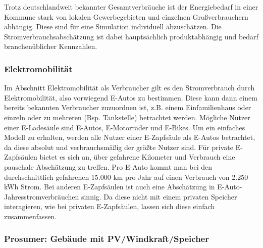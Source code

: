 Trotz deutschlandweit bekannter Gesamtverbräuche ist der Energiebedarf in einer Kommune stark von lokalen Gewerbegebieten und einzelnen Großverbrauchern abhängig. 
Diese sind für eine Simulation individuell abzuschätzen. Die Stromverbrauchsabschätzung ist dabei hauptsächlich produktabhängig und bedarf branchenüblicher Kennzahlen.

\subsubsection{Elektromobilität}

Im Abschnitt Elektromobilität als Verbraucher gilt es den Stromverbrauch durch Elektromobilität, also vorwiegend E-Autos zu bestimmen. 
Diese kann dann einem bereits bekannten Verbraucher zuzuordnen ist, z.B. einem Einfamilienhaus oder einzeln oder zu mehreren (Bsp. Tankstelle) betrachtet werden.
Mögliche Nutzer einer E-Ladesäule sind E-Autos, E-Motorräder und E-Bikes. 
Um ein einfaches Modell zu erhalten, werden alle Nutzer einer E-Zapfsäule als E-Autos betrachtet, da diese absolut und verbrauchsmäßig der größte Nutzer sind. 
Für private E-Zapfsäulen bietet es sich an, über gefahrene Kilometer und Verbrauch eine pauschale Abschätzung zu treffen. 
Pro E-Auto kommt man bei den durchschnittlich gefahrenen 15.000 km pro Jahr auf einen Verbrauch von 2.250 kWh Strom. 
Bei anderen E-Zapfsäulen ist auch eine Abschätzung in E-Auto-Jahresstromverbräuchen sinnig. 
Da diese nicht mit einem privaten Speicher interagieren, wie bei privaten E-Zapfsäulen, lassen sich diese einfach zusammenfassen.

\subsubsection{Prosumer: Gebäude mit PV/Windkraft/Speicher}

